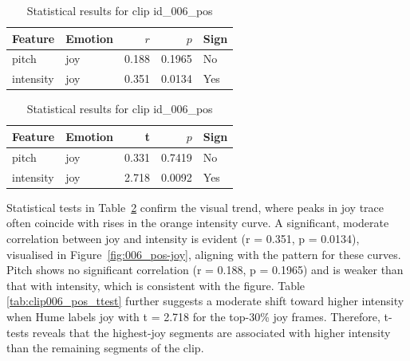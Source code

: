 \begin{table}[ht]
    \centering
    \begin{subtable}[t]{0.48\textwidth}
      \centering
      \caption{Pearson Correlation (Clip id\_006\_pos)}
      \label{tab:clip006_pos_pearson}
      \begin{tabular}{llrrl}
        \toprule
        Feature            & Emotion &  $r$ & $p$ & Sign \\
        \midrule
        pitch\     & joy     &  0.188        & 0.1965    & No  \\
        intensity & joy     &  0.351        & 0.0134    & Yes \\
        \bottomrule
      \end{tabular}
    \end{subtable}
    \hfill
    \begin{subtable}[t]{0.48\textwidth}
      \centering
      \caption{t-test (Clip id\_006\_pos)}
      \label{tab:clip006_pos_ttest}
      \begin{tabular}{llrrl}
        \toprule
        Feature            & Emotion & t & $p$ & Sign \\
        \midrule
        pitch     & joy     &  0.331       & 0.7419    & No  \\
        intensity & joy     &  2.718       & 0.0092    & Yes \\
        \bottomrule
      \end{tabular}
    \end{subtable}
    \caption{Statistical results for clip id\_006\_pos}
    \label{tab:clip006_pos_stats}
  \end{table}
  

  Statistical tests in Table~\ref{tab:clip006_pos_stats} confirm the visual trend, where peaks in joy trace often coincide with rises in the orange intensity curve. 
  A significant, moderate correlation between joy and intensity is evident (r = 0.351, p = 0.0134), visualised in Figure~\ref{fig:006_pos-joy}, aligning with the pattern for these curves. 
  Pitch shows no significant correlation (r = 0.188, p = 0.1965) and is weaker than that with intensity, which is consistent with the figure.
  Table \ref{tab:clip006_pos_ttest} further suggests a moderate shift toward higher intensity when Hume labels joy with t = 2.718 for the top-30\% joy frames. Therefore, t-tests reveals that the highest-joy segments are associated with higher intensity than the remaining segments of the clip.


